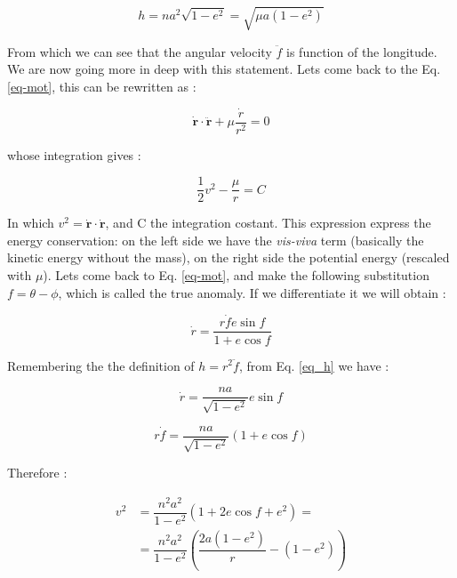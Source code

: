 \documentclass[12pt,%
               a4paper,%
               oneside,openany,%
               titlepage,%
               headinclude,footinclude,%
               BCOR5mm,%
               cleardoublepage=empty,%
               tablecaptionabove,%
               floatperchapter,
               ]{scrreprt}                 %
\begin{document}
\begin{equation}
h=na^{2}\sqrt{1-e^{2}}=\sqrt{\mu a(1-e^{2})}
\label{eq_h}
\end{equation}

From which we can see that the angular velocity $\ddot{f}$ is function of the longitude. We are now going more in deep with this statement. Lets come back to the Eq. \ref{eq-mot}, this can be rewritten as \cite{murray1999solar}:

\begin{equation}
\dot{\textbf{r}}\cdot\ddot{\textbf{r}}+\mu\dfrac{\dot{r}}{r^{2}}=0
\end{equation}

whose integration gives \cite{murray1999solar}:

\begin{equation}
\frac{1}{2}v^{2}-\frac{\mu}{r}=C
\label{energy_cons}
\end{equation}

In which $v^{2}=\dot{\textbf{r}}\cdot\dot{\textbf{r}}$, and C the integration costant. This expression express the energy conservation: on the left side we have the \textit{vis-viva} term (basically the kinetic energy without the mass), on the right side the potential energy (rescaled with $\mu$). Lets come back to Eq. \ref{eq-mot}, and make the following substitution $f=\theta-\phi$, which is called the true anomaly. If we differentiate it we will obtain \cite{murray1999solar}:

\begin{equation}
\dot{r}=\frac{r\dot{f}e\sin f}{1+e\cos f}
\end{equation}


Remembering the the definition of $h=r^{2}\ddot{f}$, from Eq. \ref{eq_h} we have  \cite{murray1999solar}:

\begin{equation}
\dot{r}=\frac{na}{\sqrt{1-e^{2}}}e\sin f
\end{equation}

\begin{equation}
r\dot{f}=\frac{na}{\sqrt{1-e^{2}}}\left(1+e\cos f\right)
\end{equation}

Therefore \cite{murray1999solar}:


\begin{equation}
\begin{split}
v^{2}&=\dfrac{n^{2}a^{2}}{1-e^{2}}\left(1+2e\cos f +e^{2}\right)= \\
&=\dfrac{n^{2}a^{2}}{1-e^{2}}\left(\dfrac{2a(1-e^{2})}{r}-(1-e^{2})\right)
\end{split}
\end{equation}
\end{document}
